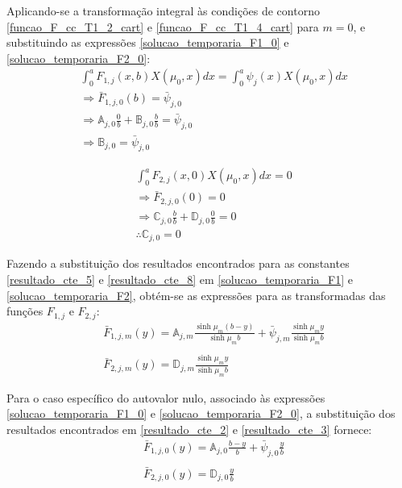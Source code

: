 Aplicando-se a transformação integral às condições de contorno \eqref{funcao_F_cc_T1_2_cart} e \eqref{funcao_F_cc_T1_4_cart} para $m = 0$, e substituindo as expressões \eqref{solucao_temporaria_F1_0} e \eqref{solucao_temporaria_F2_0}:
\begin{align}
& \int_0^a F_{1,j}(x, b)X(\mu_0, x)dx = \int_0^a \psi_j(x)X(\mu_0, x)dx \nonumber \\
& \Rightarrow \bar{F}_{1,j,0}(b) = \bar{\psi}_{j,0} \nonumber \\
& \Rightarrow \mathbb{A}_{j,0}\frac{0}{b} + \mathbb{B}_{j,0}\frac{b}{b} = \bar{\psi}_{j,0} \nonumber \\
& \Rightarrow \mathbb{B}_{j,0} = \bar{\psi}_{j,0} \label{resultado_cte_2}
\end{align} 

\begin{align}
& \int_0^a F_{2,j}(x, 0)X(\mu_0, x)dx = 0 \nonumber \\
& \Rightarrow \bar{F}_{2,j,0}(0) = 0 \nonumber \\
& \Rightarrow \mathbb{C}_{j,0}\frac{b}{b} + \mathbb{D}_{j,0}\frac{0}{b} = 0 \nonumber \\
& \therefore \mathbb{C}_{j,0} = 0 \label{resultado_cte_3}
\end{align}

Fazendo a substituição dos resultados encontrados para as constantes \eqref{resultado_cte_5} e \eqref{resultado_cte_8}
em \eqref{solucao_temporaria_F1} e \eqref{solucao_temporaria_F2}, obtém-se as expressões para as transformadas das funções $F_{1,j}$ e $F_{2,j}$:
\begin{align}
& \bar{F}_{1,j,m}(y) = \mathbb{A}_{j,m}\frac{\sinh\mu_m (b - y)}{\sinh\mu_m b} + \bar{\psi}_{j, m}\frac{\sinh\mu_m y}{\sinh\mu_m b} \label{math_A_1} \\ \nonumber \\
& \bar{F}_{2,j,m}(y) = \mathbb{D}_{j,m}\frac{\sinh\mu_m y}{\sinh\mu_m b} \label{math_A_2}
\end{align} 

Para o caso específico do autovalor nulo, associado às expressões \eqref{solucao_temporaria_F1_0} e \eqref{solucao_temporaria_F2_0}, a substituição dos
resultados encontrados em \eqref{resultado_cte_2} e \eqref{resultado_cte_3} fornece:
\begin{align}
& \bar{F}_{1,j,0}(y) = \mathbb{A}_{j,0}\frac{b - y}{b} + \bar{\psi}_{j,0}\frac{y}{b} \label{math_A_3} \\ \nonumber \\
& \bar{F}_{2,j,0}(y) = \mathbb{D}_{j,0}\frac{y}{b} \label{math_A_4}
\end{align} 


